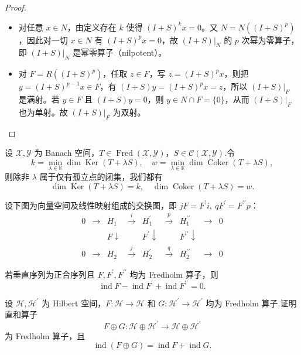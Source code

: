 \documentclass[lang=cn,newtx,10pt,scheme=chinese,thmcnt=chapter]{elegantbook}
\begin{document}
\begin{problemset}
\begin{proof}
      \begin{itemize}
    \item 对任意 $x\in N$，由定义存在 $k$ 使得 $(I+S)^k x=0$。又 $N=N((I+S)^p)$，因此对一切 $x\in N$ 有 $(I+S)^p x=0$，故 $(I+S)|_N$ 的 $p$ 次幂为零算子，即 $(I+S)|_N$ 是幂零算子（nilpotent）。
    \item 对 $F=R((I+S)^p)$，任取 $z\in F$，写 $z=(I+S)^p x$，则把 $y=(I+S)^{p-1}x\in F$，有 $(I+S)y=(I+S)^p x=z$，所以 $(I+S)|_F$ 是满射。若 $y\in F$ 且 $(I+S)y=0$，则 $y\in N\cap F=\{0\}$，从而 $(I+S)|_F$ 也为单射。故 $(I+S)|_F$ 为双射。
  \end{itemize}
\end{proof}
  \item 设 \(\mathcal{X},\mathcal{Y}\) 为 Banach 空间，\(T \in  \operatorname{Fred}\left( {\mathcal{X},\mathcal{Y}}\right)\)，\(S \in  \mathcal{C}\left( {\mathcal{X},\mathcal{Y}}\right)\).令
  \[
  k = \min_{\lambda  \in  \mathbb{K}} \dim \operatorname{Ker}\left( {T + {\lambda S}}\right), \quad
  w = \min_{\lambda  \in  \mathbb{K}} \dim \operatorname{Coker}\left( {T + {\lambda S}}\right),
  \]
  则除非 \(\lambda\) 属于仅有孤立点的闭集，我们都有
  \[
  \dim \operatorname{Ker}\left( {T + {\lambda S}}\right)  = k,\quad
  \dim \operatorname{Coker}\left( {T + {\lambda S}}\right)  = w.
  \]
  \item 设下图为向量空间及线性映射组成的交换图，即 \({jF} = {F}^{\prime }i,\ q{F}^{\prime } = {F}^{\prime \prime }p\)：
  \[
  \begin{matrix}
  0 & \rightarrow & {H}_{1} & \xrightarrow{i} & {H}_{1}^{\prime } & \xrightarrow{p} & {H}_{1}^{\prime \prime } & \rightarrow & 0 \\
  & & F \downarrow & & {F}^{\prime } \downarrow & & {F}^{\prime \prime } \downarrow \\
    0& \rightarrow  &{H}_{2} &\xrightarrow{j} &{H}_{2}^{\prime } &\xrightarrow{q} &{H}_{2}^{\prime \prime } &\rightarrow & 0
  \end{matrix}
  \]

  若垂直序列为正合序列且 \(F,{F}^{\prime },{F}^{\prime \prime }\) 均为 Fredholm 算子，则
  \[
  \operatorname{ind}F - \operatorname{ind}{F}^{\prime } + \operatorname{ind}{F}^{\prime \prime } = 0.
  \]

  \item 设 \(\mathcal{H},{\mathcal{H}}^{\prime }\) 为 Hilbert 空间，\(F : \mathcal{H} \rightarrow  \mathcal{H}\) 和 \(G : {\mathcal{H}}^{\prime } \rightarrow  {\mathcal{H}}^{\prime }\) 均为 Fredholm 算子.证明直和算子
  \[
  F \oplus  G : \mathcal{H} \oplus  {\mathcal{H}}^{\prime } \rightarrow  \mathcal{H} \oplus  {\mathcal{H}}^{\prime }
  \]
  为 Fredholm 算子，且
  \[
  \operatorname{ind}\left( {F \oplus  G}\right)  = \operatorname{ind}F + \operatorname{ind}G.
  \]


\end{problemset}
\end{document}
